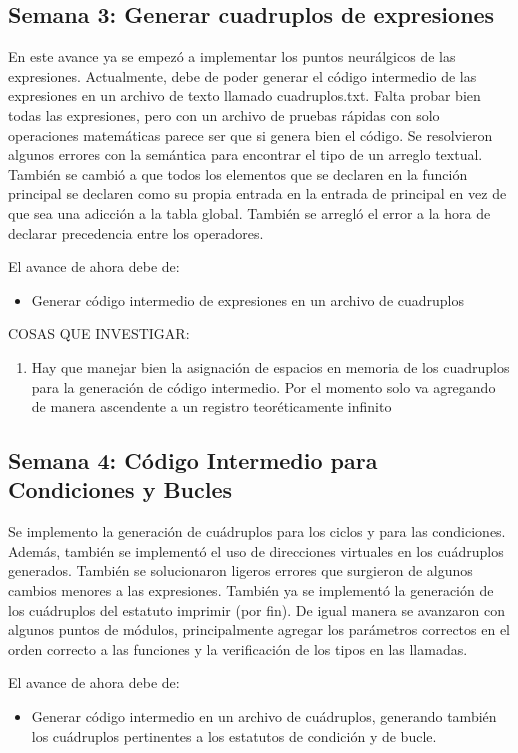 \subsection{Semana 3: Generar cuadruplos de expresiones}
En este avance ya se empezó a implementar los puntos neurálgicos de las expresiones. Actualmente, debe de poder generar el código intermedio de las expresiones en un archivo de texto llamado cuadruplos.txt. Falta probar bien todas las expresiones, pero con un archivo de pruebas rápidas con solo operaciones matemáticas parece ser que si genera bien el código. Se resolvieron algunos errores con la semántica para encontrar el tipo de un arreglo textual. También se cambió a que todos los elementos que se declaren en la función principal se declaren como su propia entrada en la entrada de principal en vez de que sea una adicción a la tabla global. También se arregló el error a la hora de declarar precedencia entre los operadores.

El avance de ahora debe de:
\begin{itemize}
    \item Generar código intermedio de expresiones en un archivo de cuadruplos
\end{itemize}


COSAS QUE INVESTIGAR:
\begin{enumerate}
    \item Hay que manejar bien la asignación de espacios en memoria de los cuadruplos para la generación de código intermedio. Por el momento solo va agregando de manera ascendente a un registro teoréticamente infinito
\end{enumerate}


\subsection{Semana 4: Código Intermedio para Condiciones y Bucles}
Se implemento la generación de cuádruplos para los ciclos y para las condiciones. Además, también se implementó el uso de direcciones virtuales en los cuádruplos generados. También se solucionaron ligeros errores que surgieron de algunos cambios menores a las expresiones. También ya se implementó la generación de los cuádruplos del estatuto imprimir (por fin). De igual manera se avanzaron con algunos puntos de módulos, principalmente agregar los parámetros correctos en el orden correcto a las funciones y la verificación de los tipos en las llamadas.

El avance de ahora debe de:
\begin{itemize}
    \item Generar código intermedio en un archivo de cuádruplos, generando también los cuádruplos pertinentes a los estatutos de condición y de bucle.
\end{itemize}


